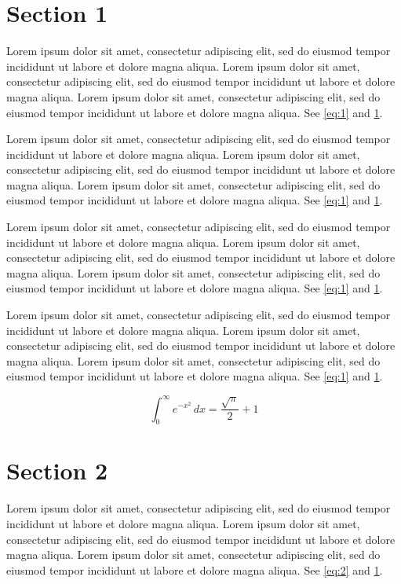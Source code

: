 \documentclass[11pt]{article}
\begin{document}
\section{Section 1}\label{sec:1}
Lorem ipsum dolor sit amet, consectetur adipiscing elit, sed do eiusmod tempor incididunt ut labore et dolore magna aliqua. Lorem ipsum dolor sit amet, consectetur adipiscing elit, sed do eiusmod tempor incididunt ut labore et dolore magna aliqua. Lorem ipsum dolor sit amet, consectetur adipiscing elit, sed do eiusmod tempor incididunt ut labore et dolore magna aliqua. See \cref{eq:1} and \cref{sec:1}.

Lorem ipsum dolor sit amet, consectetur adipiscing elit, sed do eiusmod tempor incididunt ut labore et dolore magna aliqua. Lorem ipsum dolor sit amet, consectetur adipiscing elit, sed do eiusmod tempor incididunt ut labore et dolore magna aliqua. Lorem ipsum dolor sit amet, consectetur adipiscing elit, sed do eiusmod tempor incididunt ut labore et dolore magna aliqua. See \cref{eq:1} and \cref{sec:1}.

Lorem ipsum dolor sit amet, consectetur adipiscing elit, sed do eiusmod tempor incididunt ut labore et dolore magna aliqua. Lorem ipsum dolor sit amet, consectetur adipiscing elit, sed do eiusmod tempor incididunt ut labore et dolore magna aliqua. Lorem ipsum dolor sit amet, consectetur adipiscing elit, sed do eiusmod tempor incididunt ut labore et dolore magna aliqua. See \cref{eq:1} and \cref{sec:1}.

Lorem ipsum dolor sit amet, consectetur adipiscing elit, sed do eiusmod tempor incididunt ut labore et dolore magna aliqua. Lorem ipsum dolor sit amet, consectetur adipiscing elit, sed do eiusmod tempor incididunt ut labore et dolore magna aliqua. Lorem ipsum dolor sit amet, consectetur adipiscing elit, sed do eiusmod tempor incididunt ut labore et dolore magna aliqua. See \cref{eq:1} and \cref{sec:1}.

\begin{equation}\label{eq:1} \int_0^\infty e^{-x^2}\,dx = \frac{\sqrt{\pi}}{2} + 1\end{equation}
\section{Section 2}\label{sec:2}
Lorem ipsum dolor sit amet, consectetur adipiscing elit, sed do eiusmod tempor incididunt ut labore et dolore magna aliqua. Lorem ipsum dolor sit amet, consectetur adipiscing elit, sed do eiusmod tempor incididunt ut labore et dolore magna aliqua. Lorem ipsum dolor sit amet, consectetur adipiscing elit, sed do eiusmod tempor incididunt ut labore et dolore magna aliqua. See \cref{eq:2} and \cref{sec:1}.
\end{document}

